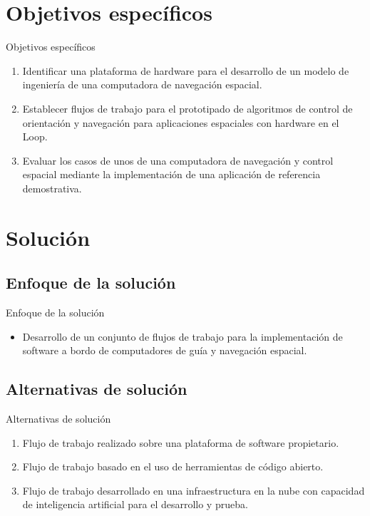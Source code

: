 \documentclass[10pt,aspectratio=169]{beamer} %
\begin{document}
\section{Objetivos específicos}
\begin{frame}{Objetivos específicos}
  \begin{enumerate}
    \item Identificar una plataforma de hardware para el desarrollo de un modelo de ingeniería de una computadora de navegación espacial.
    \item Establecer flujos de trabajo para el prototipado de algoritmos de control de orientación y navegación para aplicaciones espaciales 
          con hardware en el Loop.
    \item Evaluar los casos de unos de una computadora de navegación y control espacial mediante la implementación de una aplicación de 
          referencia demostrativa.
  \end{enumerate}
\end{frame}

\section{Solución}

\subsection{Enfoque de la solución}


\begin{frame}{Enfoque de la solución }
  \begin{itemize}
    \item Desarrollo de un conjunto de flujos de trabajo para la implementación de software 
    a bordo de computadores de guía y navegación espacial.
  \end{itemize}
\end{frame}


\subsection{Alternativas de solución}

\begin{frame}{Alternativas de solución}
  \begin{enumerate}
    \item Flujo de trabajo realizado sobre una plataforma de software propietario. 
    \item Flujo de trabajo basado en el uso de herramientas de código abierto. 
    \item Flujo de trabajo desarrollado en una infraestructura en la nube 
          con capacidad de inteligencia artificial para el desarrollo y prueba.
  \end{enumerate}
\end{frame}
\end{document}
